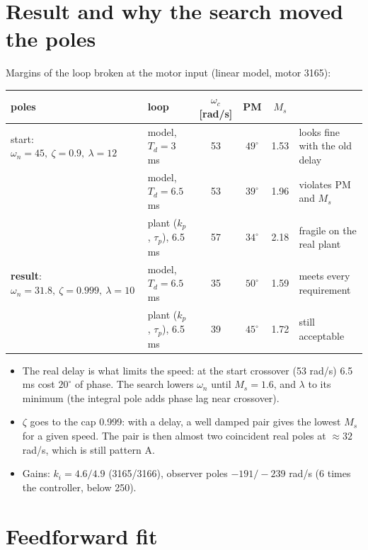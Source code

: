 \documentclass[10pt,a4paper]{article}
\begin{document}
\section{Result and why the search moved the poles}\label{sec:result}

Margins of the loop broken at the motor input (linear model, motor 3165):

\begin{tabularx}{\linewidth}{@{}l l c c c X@{}}
\toprule
poles & loop & $\omega_c$ [rad/s] & PM & $M_s$ & \\
\midrule
start: $\omega_n=45,\ \zeta=0.9,\ \lambda=12$ & model, $T_d=3$ ms & 53 & $49^\circ$ & 1.53 & looks fine with the old delay \\
 & model, $T_d=6.5$ ms & 53 & $39^\circ$ & 1.96 & violates PM and $M_s$ \\
 & plant ($k_p$, $\tau_p$), 6.5 ms & 57 & $34^\circ$ & 2.18 & fragile on the real plant \\
\midrule
\textbf{result}: $\omega_n=31.8,\ \zeta=0.999,\ \lambda=10$ & model, $T_d=6.5$ ms & 35 & $50^\circ$ & 1.59 & meets every requirement \\
 & plant ($k_p$, $\tau_p$), 6.5 ms & 39 & $45^\circ$ & 1.72 & still acceptable \\
\bottomrule
\end{tabularx}

\begin{itemize}
  \item The real delay is what limits the speed: at the start crossover (53 rad/s) 6.5 ms cost $20^\circ$ of phase.
        The search lowers $\omega_n$ until $M_s=1.6$, and $\lambda$ to its minimum (the integral pole adds phase lag near
        crossover).
  \item $\zeta$ goes to the cap 0.999: with a delay, a well damped pair gives the lowest $M_s$ for a given speed. The pair
        is then almost two coincident real poles at $\approx32$ rad/s, which is still pattern A.
  \item Gains: $k_i=4.6/4.9$ (3165/3166), observer poles $-191/-239$ rad/s (6 times the controller, below 250).
\end{itemize}

\section{Feedforward fit}\label{sec:ff}
\end{document}
